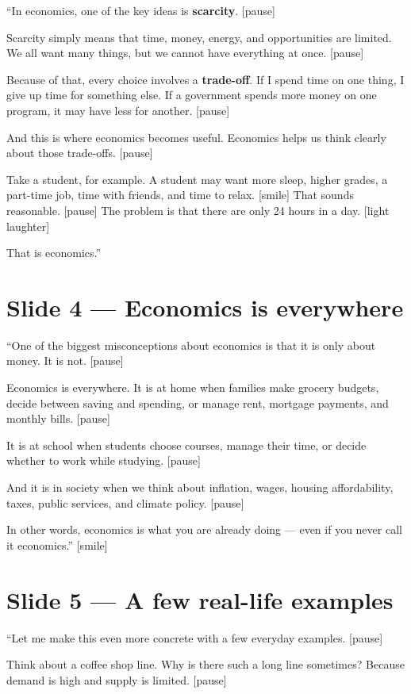 \documentclass[12pt]{article}
\begin{document}
``In economics, one of the key ideas is \textbf{scarcity}. [pause]

Scarcity simply means that time, money, energy, and opportunities are limited. We all want many things, but we cannot have everything at once. [pause]

Because of that, every choice involves a \textbf{trade-off}. If I spend time on one thing, I give up time for something else. If a government spends more money on one program, it may have less for another. [pause]

And this is where economics becomes useful. Economics helps us think clearly about those trade-offs. [pause]

Take a student, for example. A student may want more sleep, higher grades, a part-time job, time with friends, and time to relax. [smile] That sounds reasonable. [pause] The problem is that there are only 24 hours in a day. [light laughter]

That is economics.''

\section*{Slide 4 --- Economics is everywhere}

``One of the biggest misconceptions about economics is that it is only about money. It is not. [pause]

Economics is everywhere. It is at home when families make grocery budgets, decide between saving and spending, or manage rent, mortgage payments, and monthly bills. [pause]

It is at school when students choose courses, manage their time, or decide whether to work while studying. [pause]

And it is in society when we think about inflation, wages, housing affordability, taxes, public services, and climate policy. [pause]

In other words, economics is what you are already doing --- even if you never call it economics.'' [smile]
\newpage
\section*{Slide 5 --- A few real-life examples}

``Let me make this even more concrete with a few everyday examples. [pause]

Think about a coffee shop line. Why is there such a long line sometimes? Because demand is high and supply is limited. [pause]
\end{document}
